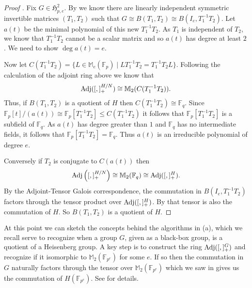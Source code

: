 \documentclass{toc}
\numberwithin{equation}{section}
\theoremstyle{plain}       %
\theoremstyle{remark}
\theoremstyle{definition}
\numberwithin{figure}{section}
\numberwithin{table}{section}
\newcommand{\mygroups}{\mathfrak{H}}
\newcommand{\bbF}{\mathbb{F}}  %
\begin{document}
\begin{proof}[Proof ]
	Fix $G\in \mygroups_{p,e}^2$.  By  we know there
	are linearly independent symmetric invertible matrices $(T_1,T_2)$ such that
	$G\cong B(T_1,T_2)\cong B(I_e,T_1^{-1}T_2)$.  Let $a(t)$ be the minimal
	polynomial of this new $T_1^{-1}T_2$.  As $T_1$ is independent of $T_2$, we
	know that $T_1^{-1}T_2$ cannot be a scalar matrix and so $a(t)$ has degree
	at least $2$.  We need to show $\deg a(t)=e$.

Now let $C(T_1^{-1}T_2)=\{L \in\mathbb{M}_e(\bbF_p) \mid
LT_1^{-1}T_2=T_1^{-1}T_2L\}$.  Following the calculation of the adjoint ring
above we know that
\[
  {\rm Adj}([,]_+^{H/N})\cong \mathbb{M}_2(C(T_1^{-1}T_2)).
\]
Thus, if $B(T_1,T_2)$ is a quotient of $H$ then $C(T_1^{-1}T_2)\cong \bbF_q$.
Since $\bbF_p[t]/(a(t))\cong \bbF_p[T_1^{-1}T_2]\leq C(T_1^{-1}T_2)$ it follows
that $\bbF_p[T_1^{-1}T_2]$ is a subfield of $\bbF_q$.  As $a(t)$ has degree
greater than $1$ and $\bbF_q$ has no intermediate fields, it follows that
$\bbF_p[T_1^{-1}T_2]=\bbF_q$.  Thus $a(t)$ is an irreducible polynomial of
degree $e$.

Conversely if $T_2$ is conjugate to $C(a(t))$ then
\[
  {\rm
Adj}\left([,]_+^{H/N}\right)\cong \mathbb{M}_2(\bbF_q)\cong {\rm
Adj}([,]_+^{H}).
\]
By the Adjoint-Tensor Galois correspondence, the commutation
in $B(I_e,T_1^{-1}T_2)$ factors through the tensor product over ${\rm
Adj}([,]_+^H)$.  By  that tensor is also the commutation
of $H$.  So $B(T_1,T_2)$ is a quotient of $H$.
\end{proof}


\begin{remark}
  At this point we can sketch the concepts behind the algorithms in
  (a), which we recall serve to recognize
  when a group $G$, given as a black-box group, is a quotient of a
  Heisenberg group.  A key step is to construct the ring
  ${\rm Adj}([,]_+^G)$ and recognize if it isomorphic to
  $\mathbb{M}_2(\bbF_{p^e})$ for some $e$.  If so then the commutation
  in $G$ naturally factors through the tensor over
  $\mathbb{M}_2(\bbF_{p^e})$ which we saw in
   gives us the commutation of
  $H(\bbF_{p^e})$.  See \cite{BMW, LW} for details.
\end{remark}
\end{document}
